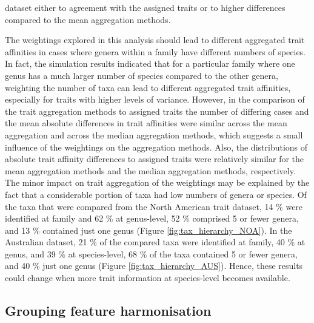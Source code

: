 \documentclass{article}
\begin{document}
dataset either to agreement with the assigned traits or to higher differences compared to the mean aggregation methods. 

The weightings explored in this analysis should lead to different aggregated trait affinities in cases where genera within a family have different numbers of species. In fact, the simulation results indicated that for a particular family where one genus has a much larger number of species compared to the other genera, weighting the number of taxa can lead to different aggregated trait affinities, especially for traits with higher levels of variance. However, in the comparison of the trait aggregation methods to assigned traits the number of differing cases and the mean absolute differences in trait affinities were similar across the mean aggregation and across the median aggregation methods, which suggests a small influence of the weightings on the aggregation methods. Also, the distributions of absolute trait affinity differences to assigned traits were relatively similar for the mean aggregation methods and the median aggregation methods, respectively. The minor impact on trait aggregation of the weightings may be explained by the fact that a considerable portion of taxa had low numbers of genera or species. Of the taxa that were compared from the North American trait dataset, 14 \% were identified at family and 62 \% at genus-level, 52 \% comprised 5 or fewer genera, and 13 \% contained just one genus (Figure \ref{fig:tax_hierarchy_NOA}). In the Australian dataset, 21 \% of the compared taxa were identified at family, 40 \% at genus, and 39 \% at species-level, 68 \% of the taxa contained 5 or fewer genera, and 40 \% just one genus (Figure \ref{fig:tax_hierarchy_AUS}). Hence, these results could change when more trait information at species-level becomes available. 

\subsection*{Grouping feature harmonisation}
\end{document}

